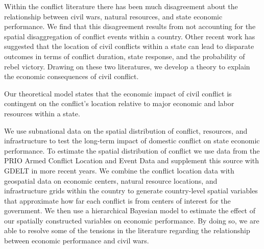 Within the conflict literature there has been much disagreement about the relationship between civil wars, natural resources, and state economic performance. We find that this disagreement results from not accounting for the spatial disaggregation of conflict events within a country.  Other recent work has suggested that the location of civil conflicts within a state can lead to disparate outcomes in terms of conflict duration, state response, and the probability of rebel victory.  Drawing on these two literatures, we develop a theory to explain the economic consequences of civil conflict.

Our theoretical model states that the economic impact of civil conflict is contingent on the conflict's location relative to major economic and labor resources within a state.

We use subnational data on the spatial distribution of conflict, resources, and infrastructure to test the long-term impact of domestic conflict on state economic performance. To estimate the spatial distribution of conflict we use data from the PRIO Armed Conflict Location and Event Data and supplement this source with GDELT in more recent years. We combine the conflict location data with geospatial data on economic centers, natural resource locations, and infrastructure grids within the country to generate country-level spatial variables that approximate how far each conflict is from centers of interest for the government. We then use a hierarchical Bayesian model to estimate the effect of our spatially constructed variables on economic performance. By doing so, we are able to resolve some of the tensions in the literature regarding the relationship between economic performance and civil wars. 